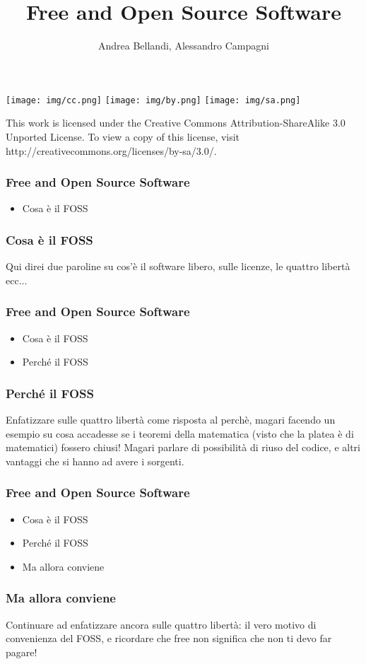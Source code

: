 \documentclass{beamer}
\title{Free and Open Source Software}
\author{Andrea Bellandi, Alessandro Campagni}
\begin{document}
\begin{frame}
  \titlepage

\vfill
\texttt{[image: img/cc.png]}
\texttt{[image: img/by.png]}
\texttt{[image: img/sa.png]}

This work is licensed under the Creative Commons Attribution-ShareAlike 3.0 Unported License. To view a copy of this license, visit http://creativecommons.org/licenses/by-sa/3.0/.
\end{frame}

\begin{frame}
  \frametitle{Free and Open Source Software}

  \begin{itemize}
    \item Cosa \`e il FOSS
  \end{itemize}

\end{frame}


\begin{frame}
  \frametitle{Cosa \`e il FOSS}
Qui direi due paroline su cos'\`e il software libero, sulle licenze,
le quattro libert\`a ecc...
\end{frame}

\begin{frame}
  \frametitle{Free and Open Source Software}

  \begin{itemize}
    \item Cosa \`e il FOSS
    \item Perch\'e il FOSS
  \end{itemize}

\end{frame}

\begin{frame}
  \frametitle{Perch\'e il FOSS}
Enfatizzare sulle quattro libert\`a come risposta al perch\`e, magari
facendo un esempio su cosa accadesse se i teoremi della matematica
(visto che la platea \`e di matematici) fossero chiusi! Magari parlare
di possibilit\`a di riuso del codice, e altri vantaggi che si hanno ad
avere i sorgenti.
\end{frame}

\begin{frame}
  \frametitle{Free and Open Source Software}

  \begin{itemize}
    \item Cosa \`e il FOSS
    \item Perch\'e il FOSS
    \item Ma allora conviene
  \end{itemize}

\end{frame}

\begin{frame}
  \frametitle{Ma allora conviene}
Continuare ad enfatizzare ancora sulle quattro libert\`a: il vero
motivo di convenienza del FOSS, e ricordare che free non significa che
non ti devo far pagare!
\end{frame}
\end{document}
